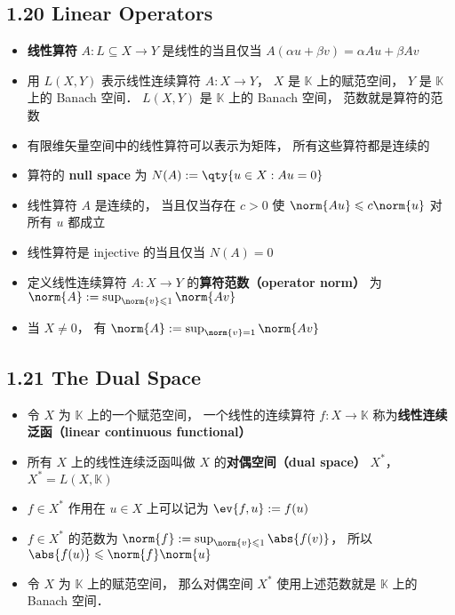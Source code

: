 \subsection{1.20 Linear Operators}
\begin{itemize}
\item \textbf{线性算符} $A: L \subseteq X\to Y$ 是线性的当且仅当 $A (\alpha u + \beta v) = \alpha Au + \beta Av$

\item 用 $L(X, Y)$ 表示线性连续算符 $A: X \to Y$， $X$ 是 $\mathbb K$ 上的赋范空间， $Y$ 是 $\mathbb K$ 上的 Banach 空间． $L(X, Y)$ 是 $\mathbb K$ 上的 Banach 空间， 范数就是算符的范数

\item 有限维矢量空间中的线性算符可以表示为矩阵， 所有这些算符都是连续的

\item 算符的 \textbf{null space} 为 $N(A) := \qty{u \in X: Au = 0}$

\item 线性算符 $A$ 是连续的， 当且仅当存在 $c > 0$ 使 $\norm{Au} \leqslant c\norm{u}$ 对所有 $u$ 都成立

\item 线性算符是 injective 的当且仅当 $N(A) = {0}$

\item 定义线性连续算符 $A: X \to Y$ 的\textbf{算符范数（operator norm）} 为 $\norm{A} := \sup_{\norm{v} \leqslant 1} \norm{A v}$

\item 当 $X \ne {0}$， 有 $\norm{A} := \sup_{\norm{v} = 1} \norm{A v}$
\end{itemize}

\subsection{1.21 The Dual Space}

\begin{itemize}
\item 令 $X$ 为 $\mathbb K$ 上的一个赋范空间， 一个线性的连续算符 $f: X \to \mathbb K$ 称为\textbf{线性连续泛函（linear continuous functional）}

\item 所有 $X$ 上的线性连续泛函叫做 $X$ 的\textbf{对偶空间（dual space）} $X^*$， $X^* = L(X, \mathbb K)$

\item $f \in X^*$ 作用在 $u \in X$ 上可以记为 $\ev{f, u} := f(u)$

\item $f\in X^*$ 的范数为 $\norm{f} := \sup_{\norm{v} \leqslant 1} \abs{f(v)}$， 所以 $\abs{f(u)} \leqslant \norm{f}\norm{u}$

\item 令 $X$ 为 $\mathbb K$ 上的赋范空间， 那么对偶空间 $X^*$ 使用上述范数就是 $\mathbb K$ 上的 Banach 空间．
\end{itemize}

